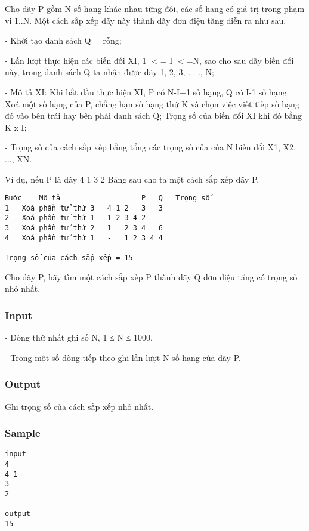 



   Cho dãy P gồm N số hạng khác nhau từng đôi, các số hạng có giá trị trong phạm vi 1..N. Một cách sắp xếp dãy này thành dãy đơn điệu tăng diễn ra như sau.  

   -         Khởi tạo danh sách Q = rỗng;  

   -         Lần lượt thực hiện các biến đổi XI, 1 $<$= I $<$=N, sao cho sau dãy biến đổi này, trong danh sách Q ta nhận được dãy 1, 2, 3, . . ., N;  

   -         Mô tả XI: Khi bắt đầu thực hiện XI, P có N-I+1 số hạng, Q có I-1 số hạng. Xoá một số hạng của P, chẳng hạn số hạng thứ K và chọn việc viết tiếp số hạng đó vào bên trái hay bên phải danh sách Q; Trọng số của biến đổi XI khi đó bằng K x I;  

   -         Trọng số của cách sắp xếp bằng tổng các trọng số của của N biến đổi X1, X2, ..., XN.  

   Ví dụ, nếu P là dãy 4 1 3 2 Bảng sau cho ta một cách sắp xếp dãy P.  
\begin{verbatim}
Bước	Mô tả	                P	Q	Trọng số
1	Xoá phần tử thứ 3	4 1 2	3	3
2	Xoá phần tử thứ 1	1 2	3 4	2
3	Xoá phần tử thứ 2	1	2 3 4	6
4	Xoá phần tử thứ 1	-	1 2 3 4	4

Trọng số của cách sắp xếp = 15

\end{verbatim}

   Cho dãy P, hãy tìm một cách sắp xếp P thành dãy Q đơn điệu tăng có trọng số nhỏ nhất.  



\subsubsection{   Input  }



   -       Dòng thứ nhất ghi số N, 1 ≤ N ≤ 1000.  

   -       Trong một số dòng tiếp theo ghi lần lượt N số hạng của dãy P.  



\subsubsection{   Output  }



   Ghi trọng số của cách sắp xếp nhỏ nhất.  



\subsubsection{   Sample  }
\begin{verbatim}
input 
4 
4 1 
3 
2

output 
15
\end{verbatim}